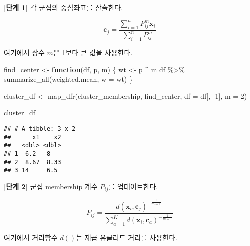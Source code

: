 \documentclass[
]{book}
\newenvironment{Shaded}{\begin{snugshade}}{\end{snugshade}}
\newcommand{\AttributeTok}[1]{\textcolor[rgb]{0.77,0.63,0.00}{#1}}
\newcommand{\ControlFlowTok}[1]{\textcolor[rgb]{0.13,0.29,0.53}{\textbf{#1}}}
\newcommand{\DecValTok}[1]{\textcolor[rgb]{0.00,0.00,0.81}{#1}}
\newcommand{\FunctionTok}[1]{\textcolor[rgb]{0.00,0.00,0.00}{#1}}
\newcommand{\NormalTok}[1]{#1}
\newcommand{\OtherTok}[1]{\textcolor[rgb]{0.56,0.35,0.01}{#1}}
\newcommand{\SpecialCharTok}[1]{\textcolor[rgb]{0.00,0.00,0.00}{#1}}
\begin{document}
\textbf{{[}단계 1{]}} 각 군집의 중심좌표를 산출한다.

\begin{equation*}
\mathbf{c}_j = \frac{\sum_{i = 1}^{n} P_{ij}^{m} \mathbf{x}_i}{\sum_{i = 1}^{n} P_{ij}^{m}}
\end{equation*}

여기에서 상수 \(m\)은 1보다 큰 값을 사용한다.

\begin{Shaded}
\begin{Highlighting}[]
\NormalTok{find\_center }\OtherTok{\textless{}{-}} \ControlFlowTok{function}\NormalTok{(df, p, m) \{}
\NormalTok{  wt }\OtherTok{\textless{}{-}}\NormalTok{ p }\SpecialCharTok{\^{}}\NormalTok{ m}
\NormalTok{  df }\SpecialCharTok{\%\textgreater{}\%} 
    \FunctionTok{summarize\_all}\NormalTok{(weighted.mean, }\AttributeTok{w =}\NormalTok{ wt)}
\NormalTok{\}}

\NormalTok{cluster\_df }\OtherTok{\textless{}{-}} \FunctionTok{map\_dfr}\NormalTok{(cluster\_membership, find\_center, }\AttributeTok{df =}\NormalTok{ df[, }\SpecialCharTok{{-}}\DecValTok{1}\NormalTok{], }\AttributeTok{m =} \DecValTok{2}\NormalTok{)}

\NormalTok{cluster\_df}
\end{Highlighting}
\end{Shaded}

\begin{verbatim}
## # A tibble: 3 x 2
##      x1    x2
##   <dbl> <dbl>
## 1  6.2   8   
## 2  8.67  8.33
## 3 14     6.5
\end{verbatim}

\textbf{{[}단계 2{]}} 군집 membership 계수 \(P_{ij}\)를 업데이트한다.

\begin{equation*}
P_{ij} = \frac{d(\mathbf{x}_i, \mathbf{c}_j)^{-\frac{1}{m - 1}}}{\sum_{a = 1}^{K} d(\mathbf{x}_i, \mathbf{c}_a)^{-\frac{1}{m - 1}}}
\end{equation*}

여기에서 거리함수 \(d()\)는 제곱 유클리드 거리를 사용한다.
\end{document}
